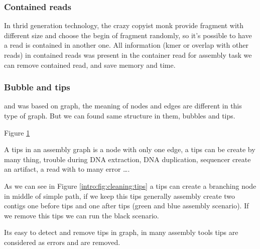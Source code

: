 \documentclass[./main.tex]{subfiles}
\begin{document}
\subsubsection{Contained reads}

In thrid generation technology, the crazy copyist monk provide fragment with different size and choose the begin of fragment randomly, so it's possible to have a read is contained in another one. All information (kmer or overlap with other reads) in contained reads was present in the container read for assembly task we can remove contained read, and save memory and time.

\subsubsection{Bubble and tips}

\OLC and \DBG was based on graph, the meaning of nodes and edges are different in this type of graph. But we can found same structure in them, bubbles and tips.

Figure \ref{intro:fig:cleaning}

\begin{figure}[ht]
    \caption{}
    \label{intro:fig:cleaning}
\end{figure}

A tips in an assembly graph is a node with only one edge, a tips can be create by many thing, trouble during DNA extraction, DNA duplication, sequencer create an artifact, a read with to many error ….

As we can see in Figure \ref{intro:fig:cleaning:tips} a tips can create a branching node in middle of simple path, if we keep this tips generally assembly create two contigs one before tips and one after tips (green and blue assembly scenario). If we remove this tips we can run the black scenario.

Its easy to detect and remove tips in graph, in many assembly tools tips are considered as errors and are removed.
\end{document}
